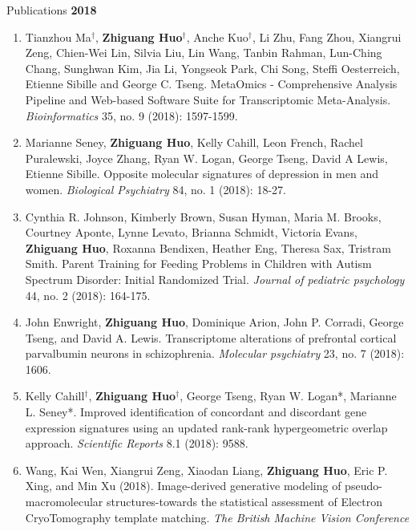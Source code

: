 \documentclass{resume} %
\begin{document}
\begin{rSection}{Publications}
\textbf{2018}
\begin{enumerate}[noitemsep,topsep=0pt, resume]

\item Tianzhou Ma$^\dagger$, {\bf  Zhiguang Huo$^\dagger$}, Anche Kuo$^\dagger$, Li Zhu, Fang Zhou, Xiangrui Zeng, Chien-Wei Lin, Silvia Liu, Lin Wang, Tanbin Rahman, Lun-Ching Chang, Sunghwan Kim, Jia Li, Yongseok Park, Chi Song, Steffi Oesterreich, Etienne Sibille and George C. Tseng. 
MetaOmics - Comprehensive Analysis Pipeline and Web-based Software Suite for Transcriptomic Meta-Analysis. \emph{Bioinformatics} 35, no. 9 (2018): 1597-1599. 

\item Marianne Seney,  {\bf Zhiguang Huo},  Kelly Cahill, Leon French, Rachel Puralewski, Joyce Zhang, Ryan W. Logan, George Tseng, David A Lewis, Etienne Sibille. Opposite molecular signatures of depression in men and women. \emph{Biological Psychiatry}  84, no. 1 (2018): 18-27.

\item 
Cynthia R. Johnson, Kimberly Brown, Susan Hyman, Maria M. Brooks, Courtney Aponte, Lynne Levato, Brianna Schmidt,
Victoria Evans, {\bf Zhiguang Huo},  Roxanna Bendixen, Heather Eng, Theresa Sax, Tristram Smith.
Parent Training for Feeding Problems in Children with Autism Spectrum Disorder: Initial Randomized Trial. \emph{Journal of pediatric psychology} 44, no. 2 (2018): 164-175.

\item 
John Enwright, {\bf Zhiguang Huo}, Dominique Arion, John P. Corradi, George Tseng, and David A. Lewis. 
Transcriptome alterations of prefrontal cortical parvalbumin neurons in schizophrenia. 
\emph{Molecular psychiatry} 23, no. 7 (2018): 1606.


\item Kelly Cahill$^\dagger$, {\bf  Zhiguang Huo$^\dagger$}, George Tseng, Ryan W. Logan*, Marianne L. Seney*.
Improved identification of concordant and discordant gene expression signatures using an updated rank-rank hypergeometric overlap approach. \emph{Scientific Reports} 8.1 (2018): 9588.

\item 
Wang, Kai Wen, Xiangrui Zeng, Xiaodan Liang, {\bf Zhiguang Huo}, Eric P. Xing, and Min Xu (2018). Image-derived generative modeling of pseudo-macromolecular structures-towards the statistical assessment of Electron CryoTomography template matching. \emph{The British Machine Vision Conference}

\end{enumerate}


\end{rSection}
\end{document}
